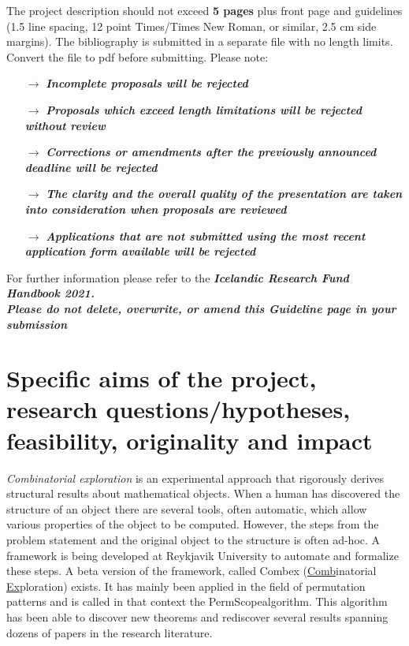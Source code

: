\documentclass{rannis}
\newcommand{\motheralg}{\textsf{Combex}}
\newcommand{\explofmothername}{\underline{Comb}inatorial \underline{Ex}ploration}
\newcommand{\tilealg}{\textsf{PermScope}}
\theoremstyle{definition}
\begin{document}
\noindent
The project description should not exceed \textbf{5 pages} plus
front page and guidelines (1.5 line spacing, 12 point Times/Times New
Roman, or similar, 2.5 cm side margins). The \mbox{bibliography} is submitted
in a separate file with no length limits. Convert the file to pdf before submitting. Please note:

\begin{itemize}
\setlength\itemsep{-0.5em}
\item[$\rightarrow$]
  \emph{\textbf{Incomplete proposals will be rejected}}
\item[$\rightarrow$]
  \emph{\textbf{Proposals which exceed length limitations will be
  rejected without review}}
\item[$\rightarrow$]
  \emph{\textbf{Corrections or amendments after the previously announced
  deadline will be rejected}}
\item[$\rightarrow$]
  \emph{\textbf{The clarity and the overall quality of the presentation
  are taken into consideration when proposals are reviewed}}
\item[$\rightarrow$]
  \emph{\textbf{Applications that are not submitted using the most
  recent application form available will be rejected}}\\
\end{itemize}

\noindent
For further information please refer to the \emph{\textbf{Icelandic
Research Fund Handbook 2021.}}\\

\emph{\textbf{Please do not delete, overwrite, or amend this Guideline
page in your submission\\
}}

\newpage

\section{Specific aims of the project, research questions/hypotheses, feasibility, originality and impact}

\emph{Combinatorial exploration} is an experimental approach that
rigorously derives structural results about mathematical objects.
When a human has discovered the structure of an object there
are several tools, often automatic, which allow various properties of the object
to be computed. However, the steps from the problem statement and the original
object to the structure is often ad-hoc.
A framework is being developed at Reykjavik University to automate and formalize
these steps.
A beta version of the framework, called
\motheralg{} (\explofmothername) exists. It has mainly been applied in
the field of permutation patterns and is called in that context the
\tilealg algorithm. This algorithm has been able
to discover new theorems and rediscover several results
spanning dozens of papers in the research literature.
\end{document}
